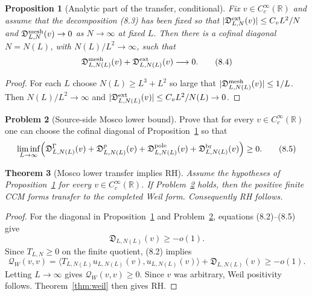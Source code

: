 \documentclass[11pt]{amsart}
\newtheorem{theorem}{Theorem}[section]
\newtheorem{proposition}[theorem]{Proposition}
\theoremstyle{definition}
\newtheorem{problem}[theorem]{Problem}
\theoremstyle{remark}
\newcommand{\R}{\mathbb R}
\newcommand{\QW}{\mathcal Q_W}
\begin{document}
\begin{proposition}[Analytic part of the transfer, conditional]
\label{prop:known-transfer}
Fix \(v\in C_c^\infty(\R)\) and assume that the decomposition (8.3)
has been fixed so that
\(|\mathfrak D^{\rm ext}_{L,N}(v)|\le C_vL^2/N\) and
\(\mathfrak D^{\rm mesh}_{L,N}(v)\to0\) as \(N\to\infty\) at fixed
\(L\).  Then there is a cofinal diagonal \(N=N(L)\), with
\(N(L)/L^2\to\infty\), such that
\[
 \mathfrak D^{\rm mesh}_{L,N(L)}(v)
 +\mathfrak D^{\rm ext}_{L,N(L)}(v)
 \longrightarrow0 .
\tag{8.4}
\]
\end{proposition}

\begin{proof}
For each \(L\) choose \(N(L)\ge L^3+L^2\) so large that
\(|\mathfrak D^{\rm mesh}_{L,N(L)}(v)|\le1/L\).  Then
\(N(L)/L^2\to\infty\) and
\(|\mathfrak D^{\rm ext}_{L,N(L)}(v)|\le C_vL^2/N(L)\to0\).
\end{proof}

\begin{problem}[Source-side Mosco lower bound]
\label{prob:source-mosco}
Prove that for every \(v\in C_c^\infty(\R)\) one can choose the cofinal
diagonal of Proposition~\ref{prop:known-transfer} so that
\[
 \liminf_{L\to\infty}
 \Bigl(
 \mathfrak D^{\Gamma}_{L,N(L)}(v)
 +\mathfrak D^{p}_{L,N(L)}(v)
 +\mathfrak D^{\rm pole}_{L,N(L)}(v)
 +\mathfrak D^{\rm br}_{L,N(L)}(v)
 \Bigr)
 \ge0 .
\tag{8.5}
\]
\end{problem}

\begin{theorem}[Mosco lower transfer implies RH]
\label{thm:mosco-transfer}
Assume the hypotheses of Proposition~\ref{prop:known-transfer} for every
\(v\in C_c^\infty(\R)\).  If Problem~\ref{prob:source-mosco} holds,
then the positive finite CCM
forms transfer to the completed Weil form.  Consequently RH follows.
\end{theorem}

\begin{proof}
For the diagonal in Proposition~\ref{prop:known-transfer} and
Problem~\ref{prob:source-mosco}, equations (8.2)--(8.5) give
\[
 \mathfrak D_{L,N(L)}(v)\ge-o(1).
\tag{8.6}
\]
Since \(T_{L,N}\ge0\) on the finite quotient, (8.2) implies
\[
 \QW(v,v)
 =
 \langle T_{L,N(L)}u_{L,N(L)}(v),u_{L,N(L)}(v)\rangle
 +\mathfrak D_{L,N(L)}(v)
 \ge-o(1).
\tag{8.7}
\]
Letting \(L\to\infty\) gives \(\QW(v,v)\ge0\).  Since \(v\) was
arbitrary, Weil positivity follows.  Theorem~\ref{thm:weil} then gives
RH.
\end{proof}
\end{document}
